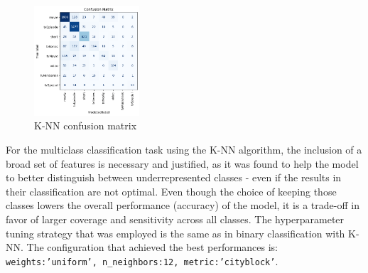 



\begin{figure}
    \centering
    \includegraphics[width=0.35\textwidth]{plots/knn_multiclass_confmatrix.png}
    \caption{K-NN confusion matrix}
    \label{fig:multiclass_knn_confusion_matrix}
\end{figure}
For the multiclass classification task using the K-NN algorithm, the inclusion of a broad set of 
features is necessary and justified, as it was found to help the model to better distinguish between 
underrepresented classes - even if the results in their classification are not optimal. 
Even though the choice of keeping those classes lowers the overall performance (accuracy) of the model, 
it is a trade-off in favor of larger coverage and sensitivity across all classes.
The hyperparameter tuning strategy that was employed is the same as in binary classification with K-NN. 
The configuration that achieved the best performances is: \texttt{{weights:'uniform', n\_neighbors:12, metric:'cityblock'}}.\\ 


